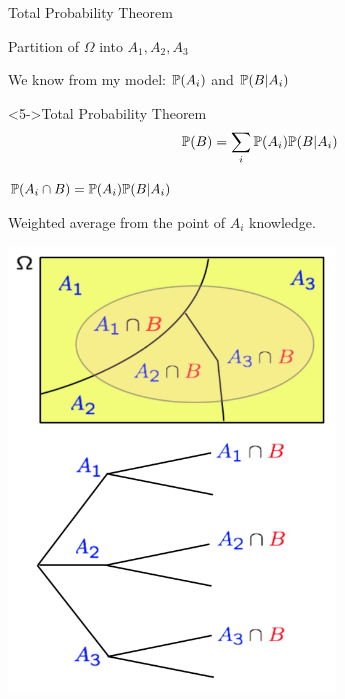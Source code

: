\documentclass[handout,fleqn,aspectratio=169]{beamer}
\begin{document}
\begin{frame}{Total Probability Theorem}

{
\plitemsep 0.1in
\bci 

\item<2-> Partition of $\Omega$ into $A_1,A_2,A_3$

\item<3-> We know from my model: $\mathbb{P}( A_i )$ and $\mathbb{P}( B | A_i )$ 

\item<4-> 


\begin{block}<5->{Total Probability Theorem}
$$
\mathbb{P}( B ) = \sum_{i} \mathbb{P}( A_i ) \mathbb{P}( B | A_i )
$$
\end{block}

\item<5-> $\mathbb{P}( A_i \cap B ) = \mathbb{P}( A_i ) \mathbb{P}( B | A_i )$

\item<6-> Weighted average from the point of $A_i$ knowledge. 
\eci 
}
{
\centering
\includegraphics[width=0.65\textwidth]{L2_total_ex.png}
}

\end{frame}
\end{document}
